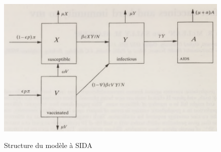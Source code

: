 \documentclass[journal, a4paper]{IEEEtran}
\begin{document}
	 \begin{figure}[!hbt]
		 \caption{Structure du modèle à SIDA}
		 \includegraphics[width=\columnwidth]{Imperfect vaccines and herd immunity to hiv_model}
		 \label{fig:hiv_model}
		 \cite{Imperfect_vaccines_and_herd_immunity_to_HIV_1993}
	 \end{figure}
\end{document}
